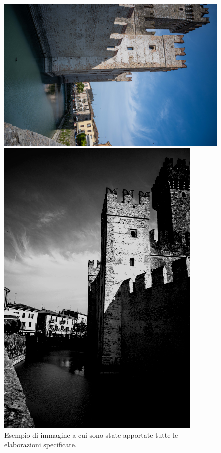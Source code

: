 \begin{figure}
    \centering
    \begin{minipage}{.5\textwidth}
      \centering
      \includegraphics[width=.7\linewidth]{images/pre.jpeg}
    \end{minipage}%
    \begin{minipage}{.5\textwidth}
      \centering
      \includegraphics[width=1\linewidth]{images/post.jpg}
    \end{minipage}
    \caption[Esempio immagine pre/post elaborazione]{Esempio di immagine a cui sono state apportate tutte le elaborazioni specificate.}
\end{figure}
\newpage
